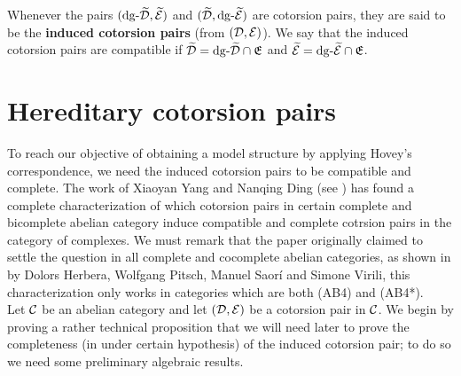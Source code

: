 \begin{definition}
    Whenever the pairs $(\mathrm{dg} \text{-}\widetilde{\mathcal{D}}, \widetilde{\mathcal{E}})$ and $(\widetilde{\mathcal{D}}, \mathrm{dg} \text{-}\widetilde{\mathcal{E}})$ are cotorsion pairs, they are said to be the \textbf{induced cotorsion pairs} (from $(\mathcal{D}, \mathcal{E})$). We say that the induced cotorsion pairs are compatible if $\widetilde{\mathcal{D}} = \mathrm{dg} \text{-}\widetilde{\mathcal{D}} \cap \mathfrak{E}$ and $\widetilde{\mathcal{E}} = \mathrm{dg} \text{-}\widetilde{\mathcal{E}} \cap \mathfrak{E}$.
\end{definition}






\section{Hereditary cotorsion pairs}

To reach our objective of obtaining a model structure by applying Hovey's correspondence, we need the induced cotorsion pairs to be compatible and complete. The work of Xiaoyan Yang and Nanqing Ding (see \cite{DingYang2014}) has found a complete characterization of which cotorsion pairs in certain complete and bicomplete abelian category induce compatible and complete cotrsion pairs in the category of complexes.  We must remark that the paper originally claimed to settle the question in all complete and cocomplete abelian categories, as shown in \cite{herbera2025poisonousexample} by Dolors Herbera, Wolfgang Pitsch, Manuel Saorí and Simone Virili, this characterization only works in categories which are both (AB4) and (AB4*). \\

Let $\mathcal{C}$ be an abelian category and let $(\mathcal{D}, \mathcal{E})$ be a cotorsion pair in $\mathcal{C}$.
We begin by proving a rather technical proposition  that we will need later to prove the completeness (in under certain hypothesis) of the induced cotorsion pair; to do so we need some preliminary algebraic results.


